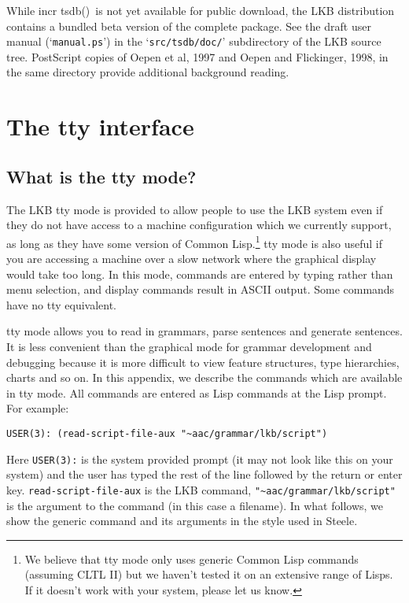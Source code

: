 \documentclass[12pt]{report}
\newcommand{\itsdb}{{\sf \lbrack incr tsdb()\rbrack}}
\begin{document}
While \itsdb\ is not yet available for public download, the LKB
distribution contains a bundled beta version of the complete
package.  See the draft user manual (`{\tt manual.ps}') in the
`{\tt src/tsdb/doc/}' subdirectory of the LKB source tree.
PostScript copies of Oepen et al, 1997 and Oepen and Flickinger, 1998, in
the same directory provide additional background reading.

\appendix
\chapter{The tty interface}
\label{tty}

\section{What is the tty mode?}

The LKB tty mode is provided to allow people to use the LKB system
even if they do not have access to a machine configuration which we
currently support,
as long as they have some version of Common Lisp.\footnote{We
believe that tty mode only uses generic Common Lisp commands (assuming
CLTL II) but we haven't tested it on an extensive range of Lisps.
If it doesn't work with your system, please let us know.}
tty mode is also useful if you are accessing a machine over a slow network
where the graphical display would take too long.
In this mode, commands are entered by typing rather than menu selection,
and display commands result in ASCII output.  Some commands
have no tty equivalent.

tty mode allows you to read in grammars, parse sentences
and generate sentences.  It is less convenient than the graphical
mode for grammar development and debugging because it is more difficult
to view feature structures, type hierarchies, charts and so on.
In this appendix, we describe the commands which are available in tty mode.
All commands are entered as Lisp
commands at the Lisp prompt.
For example:
\begin{verbatim}
USER(3): (read-script-file-aux "~aac/grammar/lkb/script")
\end{verbatim}
Here \verb+USER(3):+ is the system provided prompt (it may not look like
this on your system) and the user has typed the rest of the line
followed by the return or enter key.  \verb+read-script-file-aux+
is the LKB command, \verb+"~aac/grammar/lkb/script"+ is the argument to
the command (in this case a filename).
In what follows, we show the generic command and
its arguments in the style used in Steele.
\end{document}
